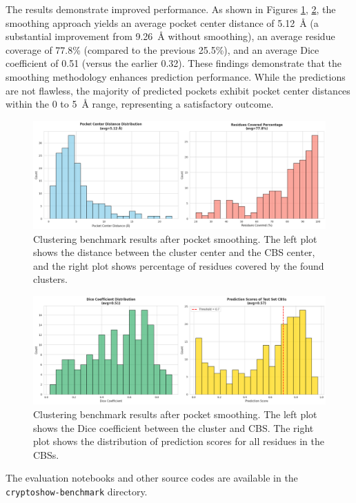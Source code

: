 The results demonstrate improved performance. As shown in Figures \ref{fig:clustering-benchmark-smoothened}, \ref{fig:clustering-benchmark-smoothened-dice}, the smoothing approach yields an average pocket center distance of 5.12~\AA{} (a substantial improvement from 9.26~\AA{} without smoothing), an average residue coverage of 77.8\% (compared to the previous 25.5\%), and an average Dice coefficient of 0.51 (versus the earlier 0.32). These findings demonstrate that the smoothing methodology enhances prediction performance. While the predictions are not flawless, the majority of predicted pockets exhibit pocket center distances within the 0 to 5~\AA{} range, representing a satisfactory outcome.

\begin{figure}[htbp]
    \centering
    \includegraphics[width=\textwidth]{img/smoothened-1.png}
    \caption{Clustering benchmark results after pocket smoothing. The left plot shows the distance between the cluster center and the CBS center, and the right plot shows percentage of residues covered by the found clusters.}
    \label{fig:clustering-benchmark-smoothened}
\end{figure}

\begin{figure}[htbp]
    \centering
    \includegraphics[width=\textwidth]{img/smoothened-2.png}
    \caption{Clustering benchmark results after pocket smoothing. The left plot shows the Dice coefficient between the cluster and CBS. The right plot shows the distribution of prediction scores for all residues in the CBSs.}
    \label{fig:clustering-benchmark-smoothened-dice}
\end{figure}

The evaluation notebooks and other source codes are available in the \lstinline!cryptoshow-benchmark! directory.
